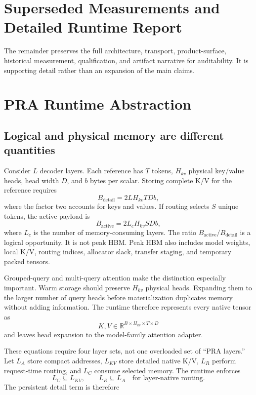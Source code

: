 \documentclass[11pt]{article}
\begin{document}
\clearpage
\appendix
\ifdefined\TECHREPORT
\section{Superseded Measurements and Detailed Runtime Report}

The remainder preserves the full architecture, transport, product-surface,
historical measurement, qualification, and artifact narrative for auditability.
It is supporting detail rather than an expansion of the main claims.

\section{PRA Runtime Abstraction}

\subsection{Logical and physical memory are different quantities}

Consider $L$ decoder layers.  Each reference has $T$ tokens, $H_{kv}$ physical
key/value heads, head width $D$, and $b$ bytes per scalar.  Storing complete K/V
for the reference requires
\begin{equation}
B_{\mathrm{detail}} = 2 L H_{kv} T D b,
\end{equation}
where the factor two accounts for keys and values.  If routing selects $S$
unique tokens, the active payload is
\begin{equation}
B_{\mathrm{active}} = 2 L_{c} H_{kv} S D b,
\end{equation}
where $L_c$ is the number of memory-consuming layers.  The ratio
$B_{\mathrm{active}}/B_{\mathrm{detail}}$ is a logical opportunity.  It is not
peak HBM.  Peak HBM also includes model weights, local K/V, routing indices,
allocator slack, transfer staging, and temporary packed tensors.

Grouped-query and multi-query attention make the distinction especially
important.  Warm storage should preserve $H_{kv}$ physical heads.  Expanding
them to the larger number of query heads before materialization duplicates
memory without adding information.  The runtime therefore represents every
native tensor as
\begin{equation}
K,V \in \mathbb{R}^{B \times H_{kv} \times T \times D}
\end{equation}
and leaves head expansion to the model-family attention adapter.

These equations require four layer sets, not one overloaded set of ``PRA
layers.'' Let $L_A$ store compact addresses, $L_{KV}$ store detailed native
K/V, $L_R$ perform request-time routing, and $L_C$ consume selected memory.
The runtime enforces
\begin{equation}
L_C \subseteq L_{KV}, \qquad
L_R \subseteq L_A \quad \text{for layer-native routing}.
\end{equation}
The persistent detail term is therefore
\end{document}
